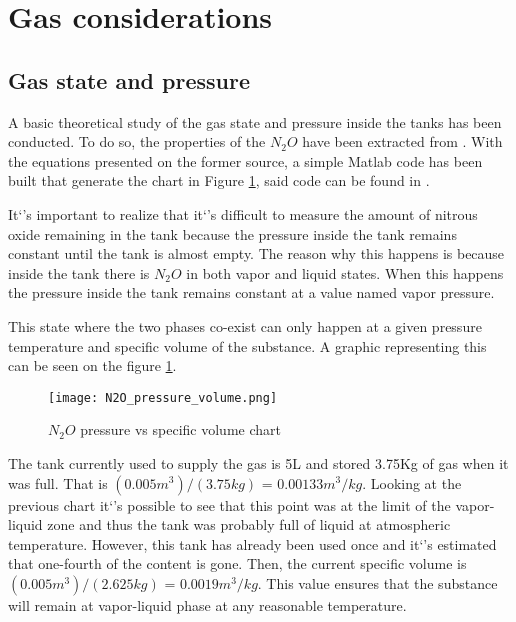 
\section*{Gas considerations}

\subsection*{Gas state and pressure}

A basic theoretical study of the gas state and pressure inside the tanks has been conducted. To do so, the properties of the $N_2O$ have been extracted from \cite{n2oReference}. With the equations presented on the former source, a simple Matlab code has been built that generate the chart in Figure \ref{fig:N2O_P_V_graph}, said code can be found in \cite{MatlabPVchart}.

It`'s important to realize that it`'s difficult to measure the amount of nitrous oxide remaining in the tank because the pressure inside the tank remains constant until the tank is almost empty. The reason why this happens is because inside the tank there is $N_2O$ in both vapor and liquid states. When this happens the pressure inside the tank remains constant at a value named vapor pressure.

This state where the two phases co-exist can only happen at a given pressure temperature and specific volume of the substance. A graphic representing this can be seen on the figure \ref{fig:N2O_P_V_graph}.

\begin{figure}[h]
  \centering
  \texttt{[image: N2O\_pressure\_volume.png]}
  \caption{$N_2O$ pressure vs specific volume chart}
  \label{fig:N2O_P_V_graph}
\end{figure}

The tank currently used to supply the gas is 5L and stored 3.75Kg of gas when it was full. That is $(0.005 m^3) / (3.75 kg)$ = $0.00133 m^3/kg$. Looking at the previous chart it`'s possible to see that this point was at the limit of the vapor-liquid zone and thus the tank was probably full of liquid at atmospheric temperature. However, this tank has already been used once and it`'s estimated that one-fourth of the content is gone. Then, the current specific volume is $(0.005 m^3) / (2.625 kg)$ = $0.0019 m^3/kg$. This value ensures that the substance will remain at vapor-liquid phase at any reasonable temperature.

